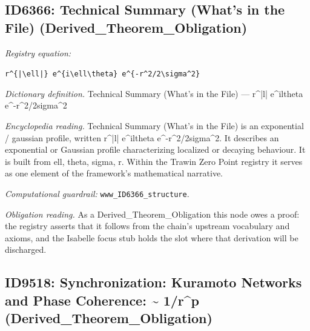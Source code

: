 \documentclass[11pt]{article}
\theoremstyle{remark}
\begin{document}
\subsection{ID6366: Technical Summary (What's in the File) (Derived\_Theorem\_Obligation)}

\noindent\textit{Registry equation:}\par
{\small\texttt{r\textasciicircum{}\{|\textbackslash{}ell|\} e\textasciicircum{}\{i\textbackslash{}ell\textbackslash{}theta\} e\textasciicircum{}\{-r\textasciicircum{}2/2\textbackslash{}sigma\textasciicircum{}2\}}}\par\medskip
\noindent\textit{Dictionary definition.} Technical Summary (What's in the File) --- r\textasciicircum{}|l| e\textasciicircum{}iltheta e\textasciicircum{}-r\textasciicircum{}2/2sigma\textasciicircum{}2\par\medskip
\noindent\textit{Encyclopedia reading.} Technical Summary (What's in the File) is an exponential / gaussian profile, written r\textasciicircum{}|l| e\textasciicircum{}iltheta e\textasciicircum{}-r\textasciicircum{}2/2sigma\textasciicircum{}2. It describes an exponential or Gaussian profile characterizing localized or decaying behaviour. It is built from ell, theta, sigma, r. Within the Trawin Zero Point registry it serves as one element of the framework's mathematical narrative.
\par\medskip\noindent\textit{Computational guardrail:} \texttt{www\_ID6366\_structure}.
\par\medskip\noindent\textit{Obligation reading.} As a Derived\_Theorem\_Obligation this node owes a proof: the registry asserts that it follows from the chain's upstream vocabulary and axioms, and the Isabelle focus stub holds the slot where that derivation will be discharged.

\subsection{ID9518: Synchronization: Kuramoto Networks and Phase Coherence: \textasciitilde{} 1/r\textasciicircum{}p (Derived\_Theorem\_Obligation)}
\end{document}
